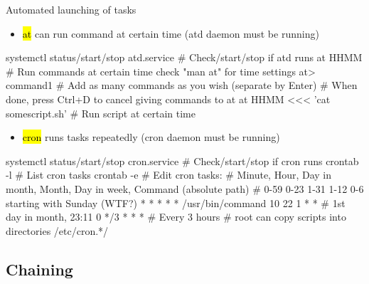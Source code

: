 \documentclass[compress, ucs, xelatex, 11pt, xcolor=svgnames,
  hyperref={
    bookmarks=true,
    unicode=true,
    colorlinks=true,
    pdftitle={Linux, command line and MetaCentrum},
    plainpages=false,
    pdfauthor={Vojtech Zeisek},
    pdfsubject={Course about use of Linux command line, writing shell scripts and using MetaCentrum of CESNET},
    pdfcreator={XeLaTeX},
    pdfkeywords={Linux, GNU, BASH, shell, command line, MetaCentrum},
    linkcolor=Red,
    anchorcolor=Blue,
    citecolor=Purple,
    filecolor=DodgerBlue,
    menucolor=DarkOrchid,
    urlcolor=DeepSkyBlue,
    pdftex},
  url={hyphens, lowtilde} %
  ]{beamer}
\renewcommand{\texttt}[1]{\hl{\ttfamily #1}}
\begin{document}
\begin{frame}[fragile]{Automated launching of tasks}
\begin{itemize}
  \item \texttt{at} can run command at certain time (atd daemon must be running)
\end{itemize}
  \begin{bashcode}
    systemctl status/start/stop atd.service # Check/start/stop if atd runs
    at HHMM # Run commands at certain time check "man at" for time settings
    at> command1 # Add as many commands as you wish (separate by Enter)
    # When done, press Ctrl+D to cancel giving commands to at
    at HHMM <<< 'cat somescript.sh' # Run script at certain time
  \end{bashcode}
\begin{itemize}
  \item \texttt{cron} runs tasks repeatedly (cron daemon must be running)
\end{itemize}
  \begin{bashcode}
    systemctl status/start/stop cron.service # Check/start/stop if cron runs
    crontab -l # List cron tasks
    crontab -e # Edit cron tasks:
    # Minute, Hour, Day in month, Month, Day in week, Command (absolute path)
    # 0-59    0-23  1-31          1-12   0-6 starting with Sunday (WTF?)
      *       *     *             *      *            /usr/bin/command
      10      22    1             *      *        # 1st day in month, 23:11
      0       */3   *             *      *        # Every 3 hours
    # root can copy scripts into directories /etc/cron.*/
  \end{bashcode}
\end{frame}

\subsection{Chaining}
\end{document}
